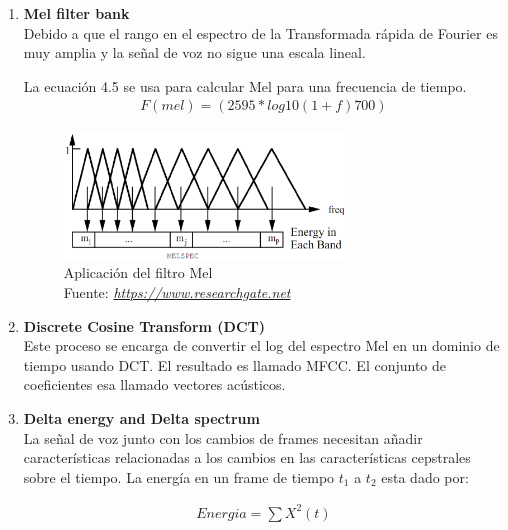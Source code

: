 \begin{enumerate}
\begin{itemize}
		\end{itemize}
	
	\item \textbf{Mel filter bank\\}
	Debido a que el rango en el espectro de la Transformada rápida de Fourier es muy amplia y la señal de voz no sigue una escala lineal.
	
	La ecuación 4.5 se usa para calcular Mel para una frecuencia de tiempo.
		\begin{equation}
			\label{TFFs}
			\begin{aligned}
			F(mel)=(2595\ast log10(1+f)700)
			\end{aligned}
		\end{equation}	
		
		
		\begin{figure}[H]
			\centering
			\includegraphics[width=0.7\textwidth]{Figures/melfilter.png}
			\caption{Aplicación del filtro Mel \\ Fuente:  \href{https://www.researchgate.net/figure/Mel-Scale-Filter-Bank-14\_fig2\_280027126}{\textit{https://www.researchgate.net}}}
			\label{onda}
		\end{figure} 
	\item \textbf{Discrete Cosine Transform (DCT)\\}
	Este proceso se encarga de convertir el log del espectro Mel en un dominio de tiempo usando DCT. El resultado es llamado MFCC. El conjunto de coeficientes esa llamado vectores acústicos.
	\item \textbf{Delta energy and Delta spectrum\\}
	La señal de voz junto con los cambios de frames necesitan añadir características relacionadas a los cambios en las características cepstrales sobre el tiempo. La energía en un frame de tiempo $t_{1}$ a $t_{2}$ esta dado por:
	
	\begin{equation}
		\label{energia}
		\begin{aligned}
			Energia=\sum X^{2}(t)
		\end{aligned}
	\end{equation}	
\end{enumerate}

